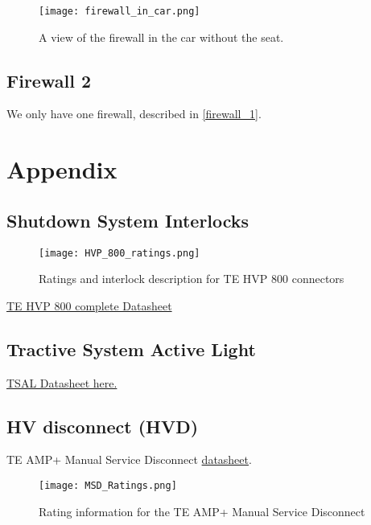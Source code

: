 \documentclass{article}
\begin{document}
\begin{figure}[H]
    \centering
    \texttt{[image: firewall\_in\_car.png]}
    \caption{A view of the firewall in the car without the seat. }
    \label{fig:firewall_in_car}
\end{figure}

\subsection{Firewall 2}\label{firewall_2}
We only have one firewall, described in \ref{firewall_1}.

\section{Appendix}\label{appendix}


\subsection{Shutdown System Interlocks}\label{sec:appendix_interlocks}
\begin{figure}[H]
	\texttt{[image: HVP\_800\_ratings.png]}
	\caption{Ratings and interlock description for TE HVP 800 connectors}
	\label{fig:hvp_800_ratings}
\end{figure}
\href{http://www.te.com/content/dam/te-com/documents/hybrid-and-electric-mobility-solutions/global/8-1773462-1-hvp-800.pdf}{TE HVP 800 complete Datasheet}

\hypertarget{TSALdatasheet}{}
\subsection{Tractive System Active Light}
\href{https://d114hh0cykhyb0.cloudfront.net/pdfs/MSTRB-X-X+Mini+Strobe+LED.pdf}{TSAL Datasheet here.}

\subsection{HV disconnect (HVD)}\label{sec:appendix_hvd}
TE AMP+ Manual Service Disconnect \href{http://www.te.com/content/dam/te-com/documents/hybrid-and-electric-mobility-solutions/global/8-1773462-2-msd.pdf}{datasheet}.

\begin{figure}[H]
	\texttt{[image: MSD\_Ratings.png]}
	\caption{Rating information for the TE AMP+ Manual Service Disconnect}
\end{figure}
\end{document}
